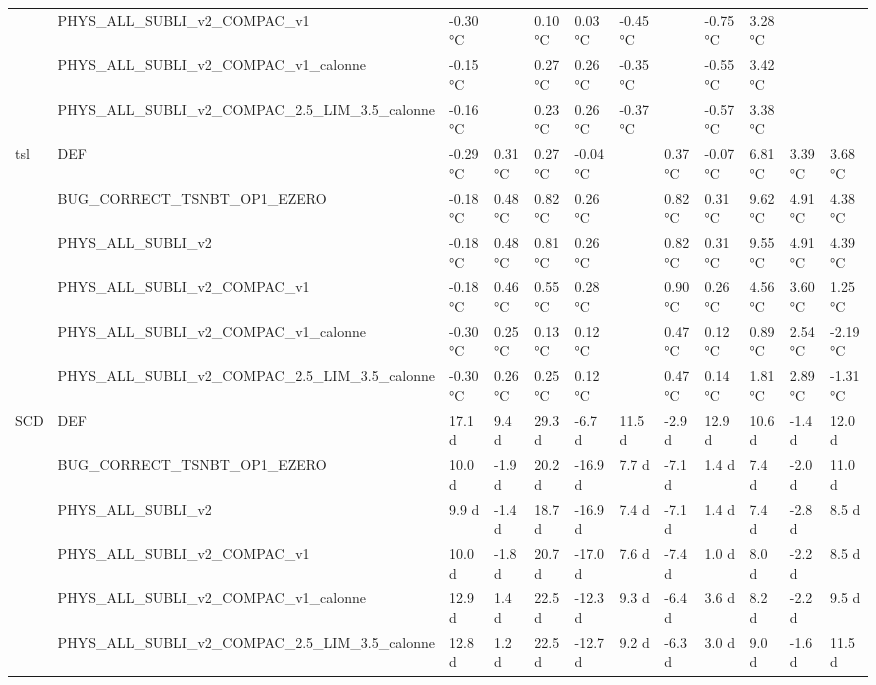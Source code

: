 \begin{tabular}{llllllllllll}
 & PHYS_ALL_SUBLI_v2_COMPAC_v1 & -0.30 °C &  & 0.10 °C & 0.03 °C & -0.45 °C &  & -0.75 °C & 3.28 °C &  &  \\
 & PHYS_ALL_SUBLI_v2_COMPAC_v1_calonne & -0.15 °C &  & 0.27 °C & 0.26 °C & -0.35 °C &  & -0.55 °C & 3.42 °C &  &  \\
 & PHYS_ALL_SUBLI_v2_COMPAC_2.5_LIM_3.5_calonne & -0.16 °C &  & 0.23 °C & 0.26 °C & -0.37 °C &  & -0.57 °C & 3.38 °C &  &  \\
\cline{1-12}
\multirow[t]{6}{*}{tsl} & DEF & -0.29 °C & 0.31 °C & 0.27 °C & -0.04 °C &  & 0.37 °C & -0.07 °C & 6.81 °C & 3.39 °C & 3.68 °C \\
 & BUG_CORRECT_TSNBT_OP1_EZERO & -0.18 °C & 0.48 °C & 0.82 °C & 0.26 °C &  & 0.82 °C & 0.31 °C & 9.62 °C & 4.91 °C & 4.38 °C \\
 & PHYS_ALL_SUBLI_v2 & -0.18 °C & 0.48 °C & 0.81 °C & 0.26 °C &  & 0.82 °C & 0.31 °C & 9.55 °C & 4.91 °C & 4.39 °C \\
 & PHYS_ALL_SUBLI_v2_COMPAC_v1 & -0.18 °C & 0.46 °C & 0.55 °C & 0.28 °C &  & 0.90 °C & 0.26 °C & 4.56 °C & 3.60 °C & 1.25 °C \\
 & PHYS_ALL_SUBLI_v2_COMPAC_v1_calonne & -0.30 °C & 0.25 °C & 0.13 °C & 0.12 °C &  & 0.47 °C & 0.12 °C & 0.89 °C & 2.54 °C & -2.19 °C \\
 & PHYS_ALL_SUBLI_v2_COMPAC_2.5_LIM_3.5_calonne & -0.30 °C & 0.26 °C & 0.25 °C & 0.12 °C &  & 0.47 °C & 0.14 °C & 1.81 °C & 2.89 °C & -1.31 °C \\
\cline{1-12}
\multirow[t]{6}{*}{SCD} & DEF & 17.1 d & 9.4 d & 29.3 d & -6.7 d & 11.5 d & -2.9 d & 12.9 d & 10.6 d & -1.4 d & 12.0 d \\
 & BUG_CORRECT_TSNBT_OP1_EZERO & 10.0 d & -1.9 d & 20.2 d & -16.9 d & 7.7 d & -7.1 d & 1.4 d & 7.4 d & -2.0 d & 11.0 d \\
 & PHYS_ALL_SUBLI_v2 & 9.9 d & -1.4 d & 18.7 d & -16.9 d & 7.4 d & -7.1 d & 1.4 d & 7.4 d & -2.8 d & 8.5 d \\
 & PHYS_ALL_SUBLI_v2_COMPAC_v1 & 10.0 d & -1.8 d & 20.7 d & -17.0 d & 7.6 d & -7.4 d & 1.0 d & 8.0 d & -2.2 d & 8.5 d \\
 & PHYS_ALL_SUBLI_v2_COMPAC_v1_calonne & 12.9 d & 1.4 d & 22.5 d & -12.3 d & 9.3 d & -6.4 d & 3.6 d & 8.2 d & -2.2 d & 9.5 d \\
 & PHYS_ALL_SUBLI_v2_COMPAC_2.5_LIM_3.5_calonne & 12.8 d & 1.2 d & 22.5 d & -12.7 d & 9.2 d & -6.3 d & 3.0 d & 9.0 d & -1.6 d & 11.5 d \\
\cline{1-12}
\bottomrule
\end{tabular}
